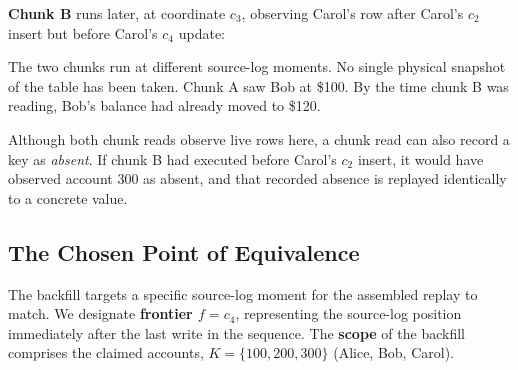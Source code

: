 \documentclass[letterpaper,10pt,twocolumn]{article}
\begin{document}
\begin{center}\footnotesize
{}
\end{center}

\textbf{Chunk B} runs later, at coordinate $c_3$, observing
Carol's row after Carol's $c_2$ insert but before
Carol's $c_4$ update:

\begin{center}\footnotesize
{}
\end{center}

The two chunks run at different source-log moments. No single physical
snapshot of the table has been taken. Chunk A saw Bob at \$100. By the
time chunk B was reading, Bob's balance had already moved to \$120.

Although both chunk reads observe live rows here, a chunk read can
also record a key as \emph{absent}. If chunk B had executed before Carol's
$c_2$ insert, it would have observed account 300 as absent,
and that recorded absence is replayed identically to a concrete value.

\subsection{The Chosen Point of
Equivalence}\label{the-chosen-point-of-equivalence}

The backfill targets a specific source-log moment for the assembled
replay to match. We designate
\textbf{frontier $f = c_4$}, representing the source-log position
immediately after the last write in the sequence. The \textbf{scope} of the
backfill comprises the claimed accounts, $K = \{100, 200, 300\}$
(Alice, Bob, Carol).
\end{document}
